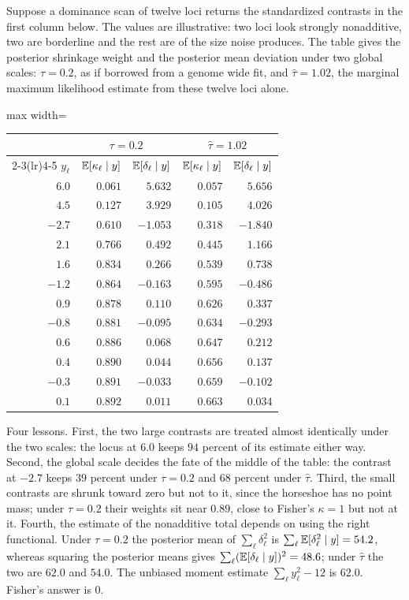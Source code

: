 \begin{example}
\label{ftns:ex:panel}
Suppose a dominance scan of twelve loci returns the standardized contrasts in the first column
below. The values are illustrative: two loci look strongly nonadditive, two are borderline and the
rest are of the size noise produces. The table gives the posterior shrinkage weight and the
posterior mean deviation under two global scales: $\tau=0.2$, as if borrowed from a genome wide
fit, and $\hat\tau=1.02$, the marginal maximum likelihood estimate from these twelve loci alone.
\begin{center}
\begin{adjustbox}{max width=\textwidth}
\begin{tabular}{rrrrr}
\toprule
& \multicolumn{2}{c}{$\tau=0.2$} & \multicolumn{2}{c}{$\hat\tau=1.02$} \\
\cmidrule(lr){2-3}\cmidrule(lr){4-5}
$y_\ell$ & $\mathbb{E}[\kappa_\ell\mid y]$ & $\mathbb{E}[\delta_\ell\mid y]$ & $\mathbb{E}[\kappa_\ell\mid y]$ & $\mathbb{E}[\delta_\ell\mid y]$ \\
\midrule
$6.0$  & $0.061$ & $5.632$ & $0.057$ & $5.656$ \\
$4.5$  & $0.127$ & $3.929$ & $0.105$ & $4.026$ \\
$-2.7$ & $0.610$ & $-1.053$ & $0.318$ & $-1.840$ \\
$2.1$  & $0.766$ & $0.492$ & $0.445$ & $1.166$ \\
$1.6$  & $0.834$ & $0.266$ & $0.539$ & $0.738$ \\
$-1.2$ & $0.864$ & $-0.163$ & $0.595$ & $-0.486$ \\
$0.9$  & $0.878$ & $0.110$ & $0.626$ & $0.337$ \\
$-0.8$ & $0.881$ & $-0.095$ & $0.634$ & $-0.293$ \\
$0.6$  & $0.886$ & $0.068$ & $0.647$ & $0.212$ \\
$0.4$  & $0.890$ & $0.044$ & $0.656$ & $0.137$ \\
$-0.3$ & $0.891$ & $-0.033$ & $0.659$ & $-0.102$ \\
$0.1$  & $0.892$ & $0.011$ & $0.663$ & $0.034$ \\
\bottomrule
\end{tabular}
\end{adjustbox}
\end{center}
Four lessons. First, the two large contrasts are treated almost identically under the two scales:
the locus at $6.0$ keeps $94$ percent of its estimate either way. Second, the global scale decides
the fate of the middle of the table: the contrast at $-2.7$ keeps $39$ percent under $\tau=0.2$
and $68$ percent under $\hat\tau$. Third, the small contrasts are shrunk toward zero but not to it,
since the horseshoe has no point mass; under $\tau=0.2$ their weights sit near $0.89$, close to
Fisher's $\kappa=1$ but not at it. Fourth, the estimate of the nonadditive total depends on using
the right functional. Under $\tau=0.2$ the posterior mean of $\sum_\ell\delta_\ell^2$ is
$\sum_\ell\mathbb{E}[\delta^2_\ell\mid y]=54.2$, whereas squaring the posterior means gives
$\sum_\ell(\mathbb{E}[\delta_\ell\mid y])^2=48.6$; under $\hat\tau$ the two are $62.0$ and $54.0$. The
unbiased moment estimate $\sum_\ell y_\ell^2-12$ is $62.0$. Fisher's answer is $0$.


\end{example}
